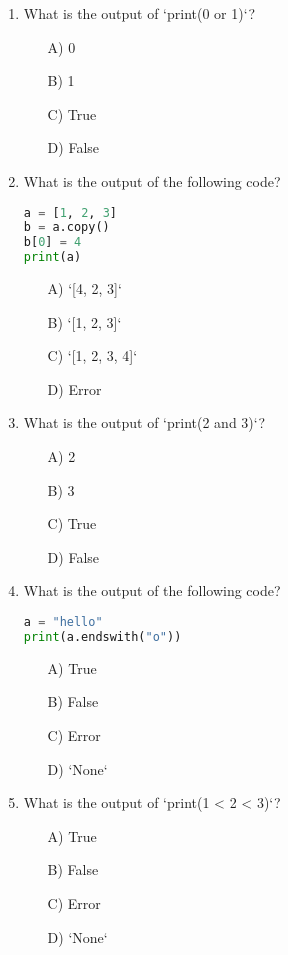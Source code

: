 \documentclass[9pt]{article}
\begin{document}
\begin{multicols}{2}
\begin{enumerate}
\item What is the output of `print(0 or 1)`?
\begin{enumerate}
\item[A)] 0
\item[B)] 1
\item[C)] True
\item[D)] False
\end{enumerate}

\item What is the output of the following code?
\begin{lstlisting}[language=Python]
a = [1, 2, 3]
b = a.copy()
b[0] = 4
print(a)
\end{lstlisting}
\begin{enumerate}
\item[A)] `[4, 2, 3]`
\item[B)] `[1, 2, 3]`
\item[C)] `[1, 2, 3, 4]`
\item[D)] Error
\end{enumerate}

\item What is the output of `print(2 and 3)`?
\begin{enumerate}
\item[A)] 2
\item[B)] 3
\item[C)] True
\item[D)] False
\end{enumerate}

\item What is the output of the following code?
\begin{lstlisting}[language=Python]
a = "hello"
print(a.endswith("o"))
\end{lstlisting}
\begin{enumerate}
\item[A)] True
\item[B)] False
\item[C)] Error
\item[D)] `None`
\end{enumerate}

\item What is the output of `print(1 < 2 < 3)`?
\begin{enumerate}
\item[A)] True
\item[B)] False
\item[C)] Error
\item[D)] `None`
\end{enumerate}


\end{enumerate}
\end{multicols}
\end{document}
